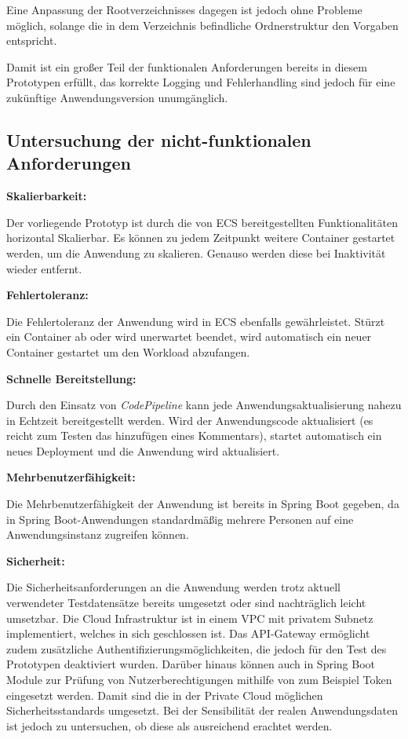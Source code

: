 Eine Anpassung der Rootverzeichnisses dagegen ist jedoch ohne Probleme möglich, solange die in dem Verzeichnis befindliche Ordnerstruktur den Vorgaben entspricht.

Damit ist ein großer Teil der funktionalen Anforderungen bereits in diesem Prototypen erfüllt, das korrekte Logging und Fehlerhandling sind jedoch für eine zukünftige Anwendungsversion unumgänglich.

\subsection{Untersuchung der nicht-funktionalen Anforderungen}
\textbf{Skalierbarkeit:}

Der vorliegende Prototyp ist durch die von \ac{ECS} bereitgestellten Funktionalitäten horizontal Skalierbar. Es können zu jedem Zeitpunkt weitere Container gestartet werden, um die Anwendung zu skalieren. Genauso werden diese bei Inaktivität wieder entfernt.

\textbf{Fehlertoleranz:}

Die Fehlertoleranz der Anwendung wird in \ac{ECS} ebenfalls gewährleistet. Stürzt ein Container ab oder wird unerwartet beendet, wird automatisch ein neuer Container gestartet um den Workload abzufangen.

\textbf{Schnelle Bereitstellung:}

Durch den Einsatz von \textit{CodePipeline} kann jede Anwendungsaktualisierung nahezu in Echtzeit bereitgestellt werden. Wird der Anwendungscode aktualisiert (es reicht zum Testen das hinzufügen eines Kommentars), startet automatisch ein neues Deployment und die Anwendung wird aktualisiert.

\textbf{Mehrbenutzerfähigkeit:}

Die Mehrbenutzerfähigkeit der Anwendung ist bereits in \gls{Spring Boot} gegeben, da in \gls{Spring Boot}-Anwendungen standardmäßig mehrere Personen auf eine Anwendungsinstanz zugreifen können. \pagebreak

\textbf{Sicherheit:}

Die Sicherheitsanforderungen an die Anwendung werden trotz aktuell verwendeter Testdatensätze bereits umgesetzt oder sind nachträglich leicht umsetzbar. Die Cloud Infrastruktur ist in einem \ac{VPC} mit privatem Subnetz implementiert, welches in sich geschlossen ist. Das API-Gateway ermöglicht zudem zusätzliche Authentifizierungsmöglichkeiten, die jedoch für den Test des Prototypen deaktiviert wurden. Darüber hinaus können auch in \gls{Spring Boot} Module zur Prüfung von Nutzerberechtigungen mithilfe von zum Beispiel Token eingesetzt werden. Damit sind die in der Private Cloud möglichen Sicherheitsstandards umgesetzt. Bei der Sensibilität der realen Anwendungsdaten ist jedoch zu untersuchen, ob diese als ausreichend erachtet werden.
\pagebreak

